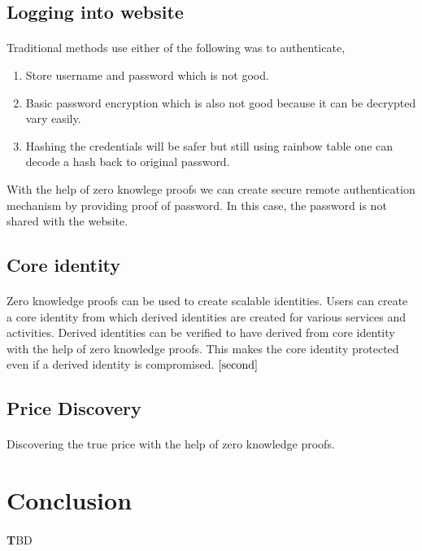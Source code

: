 \documentclass[12pt]{article}
\theoremstyle{definition}
\theoremstyle{remark}
\theoremstyle{definition}
\begin{document}
\subsection{Logging into website}
\paragraph*{}
\text Traditional methods use either of the following was to authenticate,
\begin{enumerate}
  \item Store username and password which is not good.
  \item Basic password encryption which is also not good because it can be decrypted vary easily.
  \item Hashing the credentials will be safer but still using rainbow table one can decode a hash back to original password.
\end{enumerate}
With the help of zero knowlege proofs we can create secure remote authentication mechanism by providing proof of password. In this case, the password is not shared with the website.


\subsection{Core identity}
\paragraph*{}
\text Zero knowledge proofs can be used to create scalable identities. Users can create a core identity from which derived identities are created for various services and activities. Derived identities can be verified to have derived from core identity with the help of zero knowledge proofs. This makes the core identity protected even if a derived identity is compromised. \(\cite{second}\)

\subsection{Price Discovery}
\paragraph*{}
\text Discovering the true price with the help of zero knowledge proofs.





\section{Conclusion}
\paragraph*{}
\textbf TBD


\newpage


%

\end{document}
